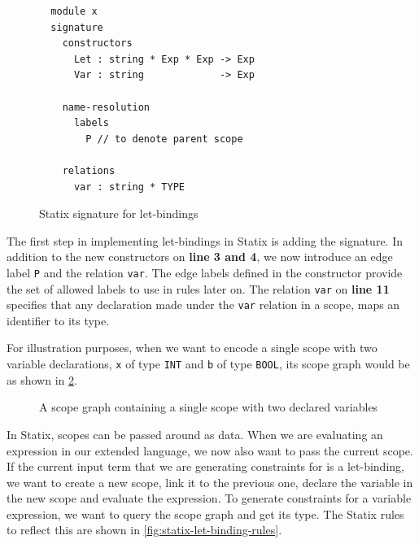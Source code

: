       \begin{figure}
        \vspace{-20pt}
        \capstart
        \begin{verbatim}
  module x
  signature
    constructors
      Let : string * Exp * Exp -> Exp
      Var : string             -> Exp

    name-resolution
      labels
        P // to denote parent scope

    relations
      var : string * TYPE
        \end{verbatim}
        \caption{\label{fig:statix-let-binding-signatures}Statix signature for let-bindings}
      \end{figure}

      The first step in implementing let-bindings in Statix is adding the signature. In addition to the new constructors on \textbf{line 3 and 4}, we now introduce an edge label \texttt{P} and the relation \texttt{var}. The edge labels defined in the constructor provide the set of allowed labels to use in rules later on. The relation \texttt{var} on \textbf{line 11} specifies that any declaration made under the \texttt{var} relation in a scope, maps an identifier to its type.
      
      For illustration purposes, when we want to encode a single scope with two variable declarations, \texttt{x} of type \texttt{INT} and \texttt{b} of type \texttt{BOOL}, its scope graph would be as shown in \cref{fig:scope-graph-relations-example}.

      \begin{figure}[h]
        \centering
        \caption{\label{fig:scope-graph-relations-example}A scope graph containing a single scope with two declared variables}
      \end{figure}

      In Statix, scopes can be passed around as data. When we are evaluating an expression in our extended language, we now also want to pass the current scope. If the current input term that we are generating constraints for is a let-binding, we want to create a new scope, link it to the previous one, declare the variable in the new scope and evaluate the expression. To generate constraints for a variable expression, we want to query the scope graph and get its type. The Statix rules to reflect this are shown in \cref{fig:statix-let-binding-rules}.

